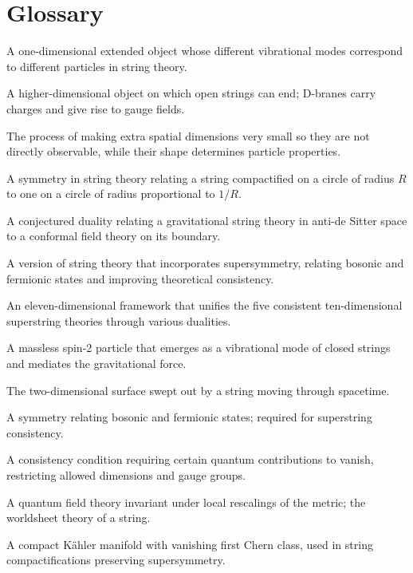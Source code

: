 \section*{Glossary}
\begin{description}[leftmargin=*,style=nextline,itemsep=0.3em]
\item[\textbf{String.}] A one-dimensional extended object whose different vibrational modes correspond to different particles in string theory.
\item[\textbf{Brane.}] A higher-dimensional object on which open strings can end; D-branes carry charges and give rise to gauge fields.
\item[\textbf{Compactification.}] The process of making extra spatial dimensions very small so they are not directly observable, while their shape determines particle properties.
\item[\textbf{T-duality.}] A symmetry in string theory relating a string compactified on a circle of radius $R$ to one on a circle of radius proportional to $1/R$.
\item[\textbf{AdS/CFT correspondence.}] A conjectured duality relating a gravitational string theory in anti-de Sitter space to a conformal field theory on its boundary.
\item[\textbf{Superstring.}] A version of string theory that incorporates supersymmetry, relating bosonic and fermionic states and improving theoretical consistency.
\item[\textbf{M-theory.}] An eleven-dimensional framework that unifies the five consistent ten-dimensional superstring theories through various dualities.
\item[\textbf{Graviton.}] A massless spin-2 particle that emerges as a vibrational mode of closed strings and mediates the gravitational force.
\item[\textbf{Worldsheet.}] The two-dimensional surface swept out by a string moving through spacetime.
\item[\textbf{Supersymmetry.}] A symmetry relating bosonic and fermionic states; required for superstring consistency.
\item[\textbf{Anomaly cancellation.}] A consistency condition requiring certain quantum contributions to vanish, restricting allowed dimensions and gauge groups.
\item[\textbf{Conformal field theory.}] A quantum field theory invariant under local rescalings of the metric; the worldsheet theory of a string.
\item[\textbf{Calabi–Yau manifold.}] A compact Kähler manifold with vanishing first Chern class, used in string compactifications preserving supersymmetry.
\end{description}
